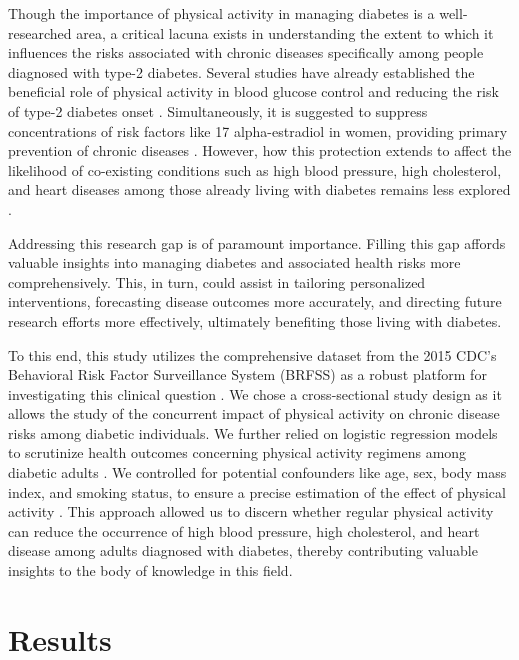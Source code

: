 \documentclass[11pt]{article}
\begin{document}
Though the importance of physical activity in managing diabetes is a well-researched area, a critical lacuna exists in understanding the extent to which it influences the risks associated with chronic diseases specifically among people diagnosed with type-2 diabetes. Several studies have already established the beneficial role of physical activity in blood glucose control and reducing the risk of type-2 diabetes onset \cite{Solanki2015EXERCISEAT, Colberg2010ExerciseAT}. Simultaneously, it is suggested to suppress concentrations of risk factors like 17 alpha-estradiol in women, providing primary prevention of chronic diseases \cite{Kruk2007PhysicalAI}. However, how this protection extends to affect the likelihood of co-existing conditions such as high blood pressure, high cholesterol, and heart diseases among those already living with diabetes remains less explored \cite{Hamer2012LowDosePA, Mora2007PhysicalAA}.

Addressing this research gap is of paramount importance. Filling this gap affords valuable insights into managing diabetes and associated health risks more comprehensively. This, in turn, could assist in tailoring personalized interventions, forecasting disease outcomes more accurately, and directing future research efforts more effectively, ultimately benefiting those living with diabetes.

To this end, this study utilizes the comprehensive dataset from the 2015 CDC's Behavioral Risk Factor Surveillance System (BRFSS) as a robust platform for investigating this clinical question \cite{Heslin2021SexualOD}. We chose a cross-sectional study design as it allows the study of the concurrent impact of physical activity on chronic disease risks among diabetic individuals. We further relied on logistic regression models to scrutinize health outcomes concerning physical activity regimens among diabetic adults \cite{Walraven2009AMO}. We controlled for potential confounders like age, sex, body mass index, and smoking status, to ensure a precise estimation of the effect of physical activity \cite{Akalu2020KnowledgeAA}. This approach allowed us to discern whether regular physical activity can reduce the occurrence of high blood pressure, high cholesterol, and heart disease among adults diagnosed with diabetes, thereby contributing valuable insights to the body of knowledge in this field.

\section*{Results}
\end{document}
